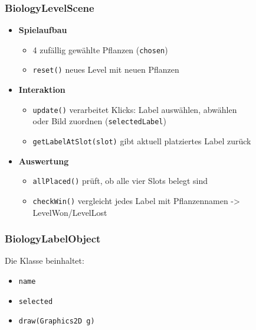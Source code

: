 \begin{frame}
	\frametitle{BiologyLevelScene}
\begin{itemize}
        \item \textbf{Spielaufbau}
        \begin{itemize} 
            \item 4 zufällig gewählte Pflanzen (\texttt{chosen})
            \item \texttt{reset()} neues Level mit neuen Pflanzen
        \end{itemize}
         \pause
        \item \textbf{Interaktion} 
        \begin{itemize} 
            \item \texttt{update()} verarbeitet Klicks: Label auswählen, abwählen\\
                  oder Bild zuordnen (\texttt{selectedLabel})
            \item \texttt{getLabelAtSlot(slot)} gibt aktuell platziertes Label zurück
        \end{itemize}
         \pause

        \item \textbf{Auswertung} 
        \begin{itemize}
            \item \texttt{allPlaced()} prüft, ob alle vier Slots belegt sind
            \item \texttt{checkWin()} vergleicht jedes Label mit  Pflanzennamen -> LevelWon/LevelLost
        \end{itemize}
    \end{itemize}
\end{frame}

\begin{frame}
	\frametitle{BiologyLabelObject}

Die Klasse beinhaltet:
	\begin{itemize}
		\item \texttt{name}
		\item \texttt{selected}
		\item \texttt{draw(Graphics2D g)}
	\end{itemize}
\end{frame}


